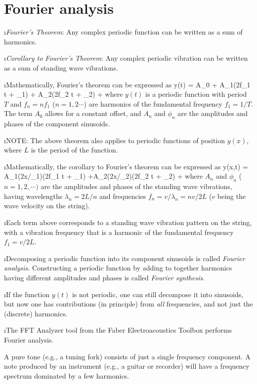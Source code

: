 \section{Fourier analysis}
\label{s:fourier}

\bi

\i {\em Fourier's Theorem}:
Any complex periodic function can be
written as a sum of harmonics.

\i {\em Corollary to Fourier's Theorem}:
Any complex periodic vibration can be
written as a sum of standing wave vibrations.

\i Mathematically, Fourier's theorem can be expressed as
%
\be
y(t) = A_0
+ A_1\sin(2\pi f_1 t + \phi_1)
+ A_2\sin(2\pi f_2 t + \phi_2)
+ \cdots
\ee
%
where $y(t)$ is a periodic function with period $T$
and $f_n=n f_1$ ($n=1,2\cdots$) are harmonics of 
the fundamental frequency $f_1= 1/T$.
The term $A_0$ allows for a constant offset, and 
$A_n$ and $\phi_n$ are the amplitudes and phases of 
the component sinusoids.

\i NOTE: The above theorem also applies to periodic
functions of position $y(x)$, where $L$ is the 
period of the function.

\i Mathematically, the corollary to Fourier's theorem
can be expressed as
%
\be
y(x,t) =
A_1\sin(2\pi x/\lambda_1)\cos(2\pi f_1 t + \phi_1)
+A_2\sin(2\pi x/\lambda_2)\cos(2\pi f_2 t + \phi_2)
+\cdots
\ee
%
where $A_n$ and $\phi_n$ ($n=1,2,\cdots)$
are the amplitudes and phases of the standing 
wave vibrations, having wavelengths
$\lambda_n = 2L/n$ and frequencies
$f_n = v/\lambda_n=nv/2L$
($v$ being the wave velocity on the string).

\i Each term above corresponds to a standing
wave vibration pattern on the string, with a vibration
frequency that is a harmonic of the fundamental
frequency $f_1=v/2L$.


\i Decomposing a periodic function into its component
sinusoids is called {\em Fourier analysis}.
Constructing a periodic function by adding to 
together harmonics having different amplitudes and
phases is called {\em Fourier synthesis}.

\i If the function $y(t)$ is not periodic, one can
still decompose it into sinusoids, but now one has
contributions (in principle) from {\em all} frequencies,
and not just the (discrete) harmonics.

\i \demo The FFT Analyzer tool from the Faber 
Electroacoustics Toolbox performs Fourier analysis.

A pure tone (e.g., a tuning fork) consists 
of just a single frequency component.
A note produced by an instrument (e.g., a guitar or
recorder) will have a frequency spectrum dominated by
a few harmonics.

